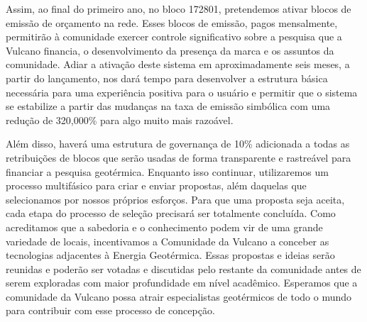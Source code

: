 \documentclass[A4paper, 12pt]{article}
\begin{document}
Assim, ao final do primeiro ano, no bloco 172801, pretendemos ativar blocos de emissão de orçamento na rede.  Esses blocos de emissão, pagos mensalmente, permitirão à comunidade exercer controle significativo sobre a pesquisa que a Vulcano financia, o desenvolvimento da presença da marca e os assuntos da comunidade.  Adiar a ativação deste sistema em aproximadamente seis meses, a partir do lançamento, nos dará tempo para desenvolver a estrutura básica necessária para uma experiência positiva para o usuário e permitir que o sistema se estabilize a partir das mudanças na taxa de emissão simbólica com uma redução de 320,000\% para algo muito mais razoável.

Além disso, haverá uma estrutura de governança de 10\% adicionada a todas as retribuições de blocos que serão usadas de forma transparente e rastreável para financiar a pesquisa geotérmica. Enquanto isso continuar, utilizaremos um processo multifásico para criar e enviar propostas, além daquelas que selecionamos por nossos próprios esforços.   Para que uma proposta seja aceita, cada etapa do processo de seleção precisará ser totalmente concluída. Como acreditamos que a sabedoria e o conhecimento podem vir de uma grande variedade de locais, incentivamos a Comunidade da Vulcano a conceber as tecnologias adjacentes à Energia Geotérmica. Essas propostas e ideias serão reunidas e poderão ser votadas e discutidas pelo restante da comunidade antes de serem exploradas com maior profundidade em nível acadêmico. Esperamos que a comunidade da Vulcano possa atrair especialistas geotérmicos de todo o mundo para contribuir com esse processo de concepção.
\end{document}
